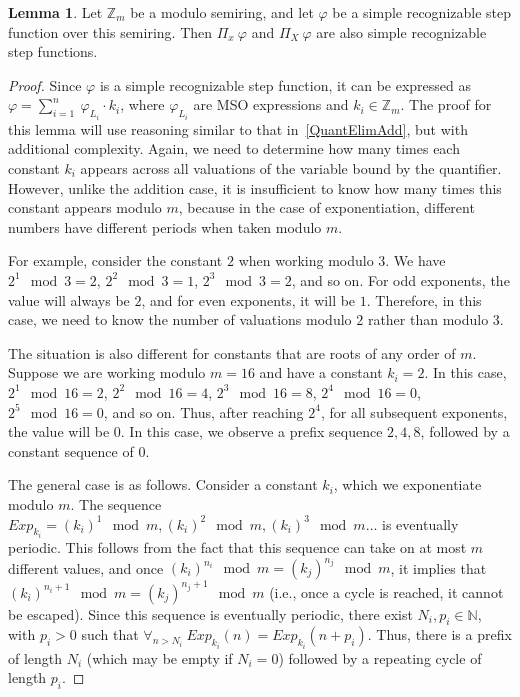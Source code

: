 \documentclass[en]{pracamgr}
\theoremstyle{definition}
\newtheorem{lemma}[theorem]{Lemma}
\begin{document}
\begin{lemma}
    \label{QuantElimMult}
    Let $\mathbb{Z}_m$ be a modulo semiring, and let $\varphi$ be a simple recognizable step function over this semiring. Then $\Pi_x \ \varphi$ and $\Pi_X \ \varphi$ are also simple recognizable step functions.
\end{lemma}

\begin{proof}
    Since $\varphi$ is a simple recognizable step function, it can be expressed as $\varphi = \sum_{i = 1}^{n} \ \varphi_{L_i} \cdot k_i$, where $\varphi_{L_i}$ are MSO expressions and $k_i \in \mathbb{Z}_m$. The proof for this lemma will use reasoning similar to that in~\cref{QuantElimAdd}, but with additional complexity. Again, we need to determine how many times each constant $k_i$ appears across all valuations of the variable bound by the quantifier. However, unlike the addition case, it is insufficient to know how many times this constant appears modulo $m$, because in the case of exponentiation, different numbers have different periods when taken modulo $m$. 
    
    For example, consider the constant $2$ when working modulo $3$. We have $2^1 \mod 3 = 2$, $2^2 \mod 3 = 1$, $2^3 \mod 3 = 2$, and so on. For odd exponents, the value will always be $2$, and for even exponents, it will be $1$. Therefore, in this case, we need to know the number of valuations modulo $2$ rather than modulo $3$. 

    The situation is also different for constants that are roots of any order of $m$. Suppose we are working modulo $m = 16$ and have a constant $k_i = 2$. In this case, $2^1 \mod 16 = 2$, $2^2 \mod 16 = 4$, $2^3 \mod 16 = 8$, $2^4 \mod 16 = 0$, $2^5 \mod 16 = 0$, and so on. Thus, after reaching $2^4$, for all subsequent exponents, the value will be $0$. In this case, we observe a prefix sequence $2,4,8$, followed by a constant sequence of $0$.

    The general case is as follows. Consider a constant $k_i$, which we exponentiate modulo $m$. The sequence $Exp_{k_i} = (k_i)^1 \mod m, (k_i)^2 \mod m, (k_i)^3 \mod m \ldots$ is eventually periodic. This follows from the fact that this sequence can take on at most $m$ different values, and once $(k_i)^{n_i} \mod m = (k_j)^{n_j} \mod m$, it implies that $(k_i)^{n_i + 1} \mod m = (k_j)^{n_j + 1} \mod m$ (i.e., once a cycle is reached, it cannot be escaped). Since this sequence is eventually periodic, there exist $N_i, p_i \in \mathbb{N}$, with $p_i > 0$ such that $\forall_{n > N_i} \ Exp_{k_i}(n) = Exp_{k_i}(n + p_i)$. Thus, there is a prefix of length $N_i$ (which may be empty if $N_i = 0$) followed by a repeating cycle of length $p_i$. 


\end{proof}
\end{document}
